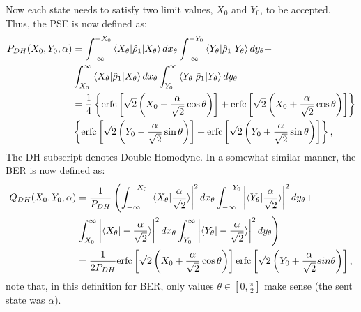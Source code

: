 \documentclass[a4paper]{article}
\begin{document}
\par
Now each state needs to satisfy two limit values, $X_0$ and $Y_0$, to be accepted. Thus, the PSE is now defined as:
\begin{equation}
\begin{aligned}
P_{DH}(X_0,Y_0,\alpha)&=\int^{-X_0}_{-\infty}\braket{X_\theta|\hat{\rho}_1|X_\theta}dx_\theta\int^{-Y_0}_{-\infty}\braket{Y_\theta|\hat{\rho}_1|Y_\theta}dy_\theta+\\
&\int_{X_0}^{\infty}\braket{X_\theta|\hat{\rho}_1|X_\theta}dx_\theta\int_{Y_0}^{\infty}\braket{Y_\theta|\hat{\rho}_1|Y_\theta}dy_\theta\\
&=\frac{1}{4}\left\lbrace\text{erfc}\left[\sqrt{2}\left(X_0-\frac{\alpha}{\sqrt{2}}\cos\theta\right)\right]+\text{erfc}\left[\sqrt{2}\left(X_0+\frac{\alpha}{\sqrt{2}}\cos\theta\right)\right]\right\rbrace\\
&\left\lbrace\text{erfc}\left[\sqrt{2}\left(Y_0-\frac{\alpha}{\sqrt{2}}\sin\theta\right)\right]+\text{erfc}\left[\sqrt{2}\left(Y_0+\frac{\alpha}{\sqrt{2}}\sin\theta\right)\right]\right\rbrace,
\end{aligned}
\end{equation}
The DH subscript denotes Double Homodyne. In a somewhat similar manner, the BER is now defined as:
\begin{equation}\label{eq:adaptedBER}
\begin{aligned}
Q_{DH}(X_0,Y_0,\alpha)&=\frac{1}{P_{DH}}\left(\int^{-X_0}_{-\infty}\left|\braket{X_\theta|\frac{\alpha}{\sqrt{2}}}\right|^2dx_\theta\int^{-Y_0}_{-\infty}\left|\braket{Y_\theta|\frac{\alpha}{\sqrt{2}}}\right|^2dy_\theta+\right.\\
&\left.\int_{X_0}^{\infty}\left|\braket{X_\theta|-\frac{\alpha}{\sqrt{2}}}\right|^2dx_\theta\int_{Y_0}^{\infty}\left|\braket{Y_\theta|-\frac{\alpha}{\sqrt{2}}}\right|^2dy_\theta\right)\\
&=\frac{1}{2P_{DH}}\text{erfc}\left[\sqrt{2}\left(X_0+\frac{\alpha}{\sqrt{2}}\cos\theta\right)\right]\text{erfc}\left[\sqrt{2}\left(Y_0+\frac{\alpha}{\sqrt{2}}sin\theta\right)\right],
\end{aligned}
\end{equation}
note that, in this definition for BER, only values $\theta\in\left[0,\frac{\pi}{2}\right]$ make sense (the sent state was $\alpha$).
\end{document}
